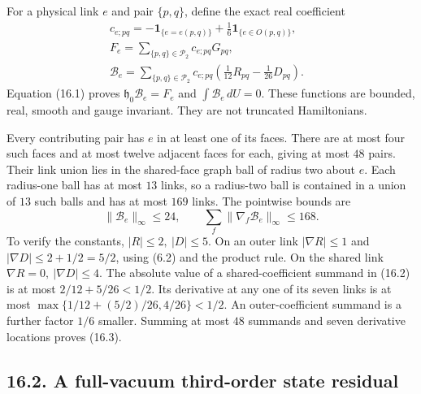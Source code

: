 \documentclass[
]{article}
\begin{document}
For a physical link \(e\) and pair \(\{p,q\}\), define the exact real
coefficient \[
\begin{split}
c_{e;pq}=-\mathbf1_{\{e=e(p,q)\}}
              +\tfrac16\mathbf1_{\{e\in O(p,q)\}},&\\
F_e=\sum_{\{p,q\}\in\mathscr P_2}c_{e;pq}G_{pq},\qquad&\\
\mathcal B_e=\sum_{\{p,q\}\in\mathscr P_2}c_{e;pq}
          \left(\tfrac1{12}R_{pq}-\tfrac1{26}D_{pq}\right).&
\end{split}
                                                               \tag{16.2}
\] Equation (16.1) proves \(\mathfrak h_0\mathcal B_e=F_e\) and
\(\int\mathcal B_e\,dU=0\). These functions are bounded, real, smooth
and gauge invariant. They are not truncated Hamiltonians.

Every contributing pair has \(e\) in at least one of its faces. There
are at most four such faces and at most twelve adjacent faces for each,
giving at most \(48\) pairs. Their link union lies in the shared-face
graph ball of radius two about \(e\). Each radius-one ball has at most
\(13\) links, so a radius-two ball is contained in a union of \(13\)
such balls and has at most \(169\) links. The pointwise bounds are \[
\|\mathcal B_e\|_\infty\le24,\qquad
\sum_f\|\nabla_f\mathcal B_e\|_\infty\le168.                  \tag{16.3}
\] To verify the constants, \(|R|\le2,\ |D|\le5\). On an outer link
\(|\nabla R|\le1\) and \(|\nabla D|\le2+1/2=5/2\), using (6.2) and the
product rule. On the shared link \(\nabla R=0,\ |\nabla D|\le4\). The
absolute value of a shared-coefficient summand in (16.2) is at most
\(2/12+5/26<1/2\). Its derivative at any one of its seven links is at
most \(\max\{1/12+(5/2)/26,4/26\}<1/2\). An outer-coefficient summand is
a further factor \(1/6\) smaller. Summing at most \(48\) summands and
seven derivative locations proves (16.3).

\subsection{16.2. A full-vacuum third-order state
residual}\label{a-full-vacuum-third-order-state-residual}
\end{document}
